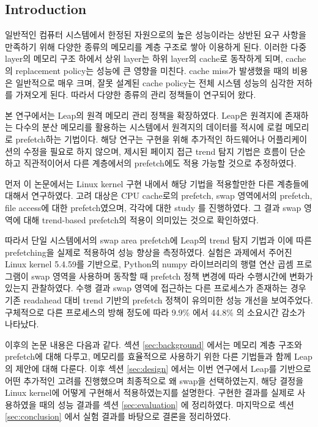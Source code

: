 \documentclass[conference,11pt]{IEEEtran}
\begin{document}
\begin{CJK}{UTF8}{}
    \section{Introduction}

    일반적인 컴퓨터 시스템에서 한정된 자원으로의 높은 성능이라는 상반된 요구 사항을 만족하기 위해 다양한 종류의 메모리를 계층 구조로 쌓아 이용하게 된다. 이러한 다중 layer의 메모리 구조 하에서 상위 layer는 하위 layer의 cache로 동작하게 되며, cache의 replacement policy는 성능에 큰 영향을 미친다. cache miss가 발생했을 때의 비용은 일반적으로 매우 크며, 잘못 설계된 cache policy는 전체 시스템 성능의 심각한 저하를 가져오게 된다. 따라서 다양한 종류의 관리 정책들이 연구되어 왔다.

    본 연구에서는 Leap\cite{leap}의 원격 메모리 관리 정책을 확장하였다. Leap은 원격지에 존재하는 다수의 분산 메모리를 활용하는 시스템에서 원격지의 데이터를 적시에 로컬 메모리로 prefetch하는 기법이다. 해당 연구는 구현을 위해 추가적인 하드웨어나 어플리케이션의 수정을 필요로 하지 않으며, 제시된 페이지 접근 trend 탐지 기법은 흐름이 단순하고 직관적이어서 다른 계층에서의 prefetch에도 적용 가능할 것으로 추정하였다.

    먼저 이 논문에서는 Linux kernel 구현 내에서 해당 기법을 적용할만한 다른 계층들에 대해서 연구하였다. 고려 대상은 CPU cache로의 prefetch, swap 영역에서의 prefetch, file access에 대한 prefetch였으며, 각각에 대한 study 를 진행하였다. 그 결과 swap 영역에 대해 trend-based prefetch의 적용이 의미있는 것으로 확인하였다.

    따라서 단일 시스템에서의 swap area prefetch에 Leap의 trend 탐지 기법과 이에 따른 prefetching을 실제로 적용하여 성능 향상을 측정하였다. 실험은 과제에서 주어진 Linux kernel 5.4.59를 기반으로, Python의 numpy 라이브러리의 행렬 연산 곱셈 프로그램이 swap 영역을 사용하며 동작할 때 prefetch 정책 변경에 따라 수행시간에 변화가 있는지 관찰하였다. 수행 결과 swap 영역에 접근하는 다른 프로세스가 존재하는 경우 기존 readahead 대비 trend 기반의 prefetch 정책이 유의미한 성능 개선을 보여주었다. 구체적으로 다른 프로세스의 방해 정도에 따라 9.9\% 에서 44.8\% 의 소요시간 감소가 나타났다.

    이후의 논문 내용은 다음과 같다. 섹션 \ref{sec:background} 에서는 메모리 계층 구조와 prefetch에 대해 다루고, 메모리를 효율적으로 사용하기 위한 다른 기법들과 함께 Leap의 제안에 대해 다룬다. 이후 섹션 \ref{sec:design} 에서는 이번 연구에서 Leap를 기반으로 어떤 추가적인 고려를 진행했으며 최종적으로 왜 swap을 선택하였는지, 해당 결정을 Linux kernel에 어떻게 구현해서 적용하였는지를 설명한다. 구현한 결과를 실제로 사용하였을 때의 성능 결과를 섹션 \ref{sec:evaluation} 에 정리하였다. 마지막으로 섹션 \ref{sec:conclusion} 에서 실험 결과를 바탕으로 결론을 정리하였다.


\end{CJK}
\end{document}
